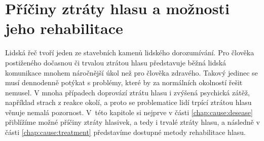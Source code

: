\chapter{Příčiny ztráty hlasu a možnosti jeho rehabilitace}
\label{chap:cause}

Lidská řeč tvoří jeden ze stavebních kamenů lidského dorozumívání. Pro člověka
postiženého dočasnou či trvalou ztrátou hlasu představuje běžná lidská
komunikace mnohem náročnější úkol než pro člověka zdravého. Takový jedinec se
musí dennodenně potýkat s problémy, které by za normálních okolností řešit
nemusel. V mnoha případech doprovází ztrátu hlasu i zvýšená psychická zátěž,
například strach z reakce okolí, a proto se problematice lidí trpící ztrátou
hlasu věnuje nemalá pozornost. V~této kapitole si nejprve v části
\ref{chap:cause:desease} přiblížíme možné příčiny ztráty hlasivek, a tedy i
trvalé ztráty hlasu, a následně v části \ref{chap:cause:treatment} představíme
dostupné metody rehabilitace hlasu.



% 
% 
